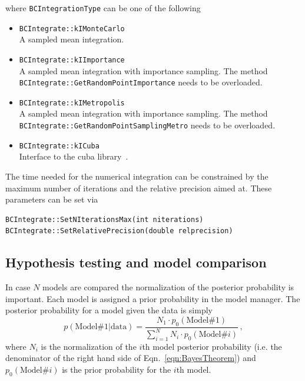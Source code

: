 \documentclass[11pt, a4paper]{article}
\begin{document}
\noindent
where \verb|BCIntegrationType| can be one of the following 
% 
\begin{itemize}
\item \verb|BCIntegrate::kIMonteCarlo| \\ 
 A sampled mean integration. 
\item \verb|BCIntegrate::kIImportance| \\ 
 A sampled mean integration with importance sampling. The method \\ 
 \verb|BCIntegrate::GetRandomPointImportance| needs to be overloaded.  
\item \verb|BCIntegrate::kIMetropolis| \\ 
 A sampled mean integration with importance sampling. The method \\ 
 \verb|BCIntegrate::GetRandomPointSamplingMetro| needs to be overloaded.  
\item \verb|BCIntegrate::kICuba| \\ 
 Interface to the cuba library~\cite{Hahn:2004fe}.
\end{itemize}

The time needed for the numerical integration can be constrained by
the maximum number of iterations and the relative precision aimed
at. These parameters can be set via 
%
\begin{small}
\begin{verbatim}
BCIntegrate::SetNIterationsMax(int niterations)
BCIntegrate::SetRelativePrecision(double relprecision) 
\end{verbatim} 
\end{small} 


\subsection{Hypothesis testing and model comparison} 

In case $N$ models are compared the normalization of the posterior
probability is important. Each model is assigned a prior probability
in the model manager. The posterior probability for a model given the
data is simply
%
\begin{equation}
p(\mathrm{Model \#1}|\mathrm{data}) = \frac{N_{1} \cdot p_{0}(\mathrm{Model \#1})}{\sum_{i = 1}^{N} N_{i} \cdot p_{0}(\mathrm{Model \#}i)} \, , 
\end{equation}
%
where $N_{i}$ is the normalization of the $i$th model posterior
probability (i.e. the denominator of the right hand side of
Eqn.~\ref{eqn:BayesTheorem}) and $p_{0}(\mathrm{Model \#}i)$ is the
prior probability for the $i$th model. 
\end{document}
